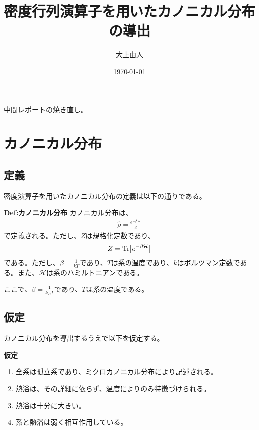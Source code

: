 \documentclass[a4paper,11pt]{jsarticle}
\numberwithin{equation}{section}
\begin{document}
\title{密度行列演算子を用いたカノニカル分布の導出}
\author{大上由人}
\date{\today}
\maketitle

中間レポートの焼き直し。\\
\section{カノニカル分布}
\subsection{定義}
密度演算子を用いたカノニカル分布の定義は以下の通りである。
\begin{itembox}[l]{\textbf{Def:カノニカル分布}}
    カノニカル分布は、
    \begin{align}
      \hat{\rho} = \frac{e^{-\beta \mathcal{H}}}{Z} \label{eq:canonical}
    \end{align}
    で定義される。ただし、$Z$は規格化定数であり、
    \begin{align}
      Z = \Tr[e^{-\beta \mathcal{H}}]
    \end{align}
    である。ただし、$\beta = \frac{1}{kT}$であり、$T$は系の温度であり、$k$はボルツマン定数である。また、$\mathcal{H}$は系のハミルトニアンである。
  \end{itembox}
  ここで、$\beta = \frac{1}{k_B T}$であり、$T$は系の温度である。\\

\subsection{仮定}
カノニカル分布を導出するうえで以下を仮定する。
\begin{itembox}[l]{\textbf{仮定}}
  \begin{enumerate}
    \item 全系は孤立系であり、ミクロカノニカル分布により記述される。
    \item 熱浴は、その詳細に依らず、温度によりのみ特徴づけられる。
    \item 熱浴は十分に大きい。
    \item 系と熱浴は弱く相互作用している。
  \end{enumerate}
\end{itembox}
\end{document}
